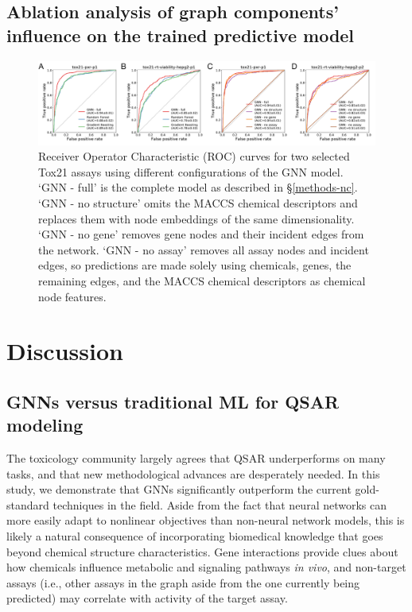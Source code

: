 \documentclass{ws-procs11x85}
\begin{document}
\subsection{Ablation analysis of graph components' influence on the trained predictive model}

\begin{figure}
   \centering
   \includegraphics[width=\textwidth]{figures/figure3.pdf}
   \caption{Receiver Operator Characteristic (ROC) curves for two selected Tox21 assays using different configurations of the GNN model. `GNN - full' is the complete model as described in \S\ref{methods-nc}. `GNN - no structure' omits the MACCS chemical descriptors and replaces them with node embeddings of the same dimensionality. `GNN - no gene' removes gene nodes and their incident edges from the network. `GNN - no assay' removes all assay nodes and incident edges, so predictions are made solely using chemicals, genes, the remaining edges, and the MACCS chemical descriptors as chemical node features.}\label{fig:5}
\end{figure}

\section{Discussion}

\subsection{GNNs versus traditional ML for QSAR modeling}
The toxicology community largely agrees that QSAR underperforms on many tasks, and that new methodological advances are desperately needed.
In this study, we demonstrate that GNNs significantly outperform the current gold-standard techniques in the field.
Aside from the fact that neural networks can more easily adapt to nonlinear objectives than non-neural network models, this is likely a natural consequence of incorporating biomedical knowledge that goes beyond chemical structure characteristics.
Gene interactions provide clues about how chemicals influence metabolic and signaling pathways \textit{in vivo}, and non-target assays (i.e., other assays in the graph aside from the one currently being predicted) may correlate with activity of the target assay.
\end{document}
